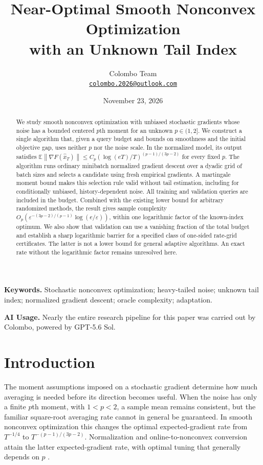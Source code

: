 \documentclass[11pt,a4paper]{article}
\title{Near-Optimal Smooth Nonconvex Optimization\\
with an Unknown Tail Index}
\author{Colombo Team\\[0.25em]
\small\href{mailto:colombo.2026@outlook.com}{\texttt{colombo.2026@outlook.com}}}
\date{November 23, 2026}
\newcommand{\E}{\mathbb{E}}
\newcommand{\eps}{\varepsilon}
\newcommand{\norm}[1]{\left\lVert #1\right\rVert}
\theoremstyle{definition}
\theoremstyle{remark}
\begin{document}
\maketitle

\begin{abstract}
We study smooth nonconvex optimization with unbiased stochastic gradients whose
noise has a bounded centered $p$th moment for an unknown $p\in(1,2]$.
We construct a single algorithm that, given a query budget and bounds on
smoothness and the initial objective gap, uses neither $p$ nor the noise scale.
In the normalized model, its output satisfies
$\E\norm{\nabla F(\widehat x_T)}
\le C_p(\log(eT)/T)^{(p-1)/(3p-2)}$ for every fixed $p$.
The algorithm runs ordinary minibatch normalized gradient descent over a
dyadic grid of batch sizes and selects a candidate using fresh empirical
gradients. A martingale moment bound makes this selection rule valid without
tail estimation, including for conditionally unbiased, history-dependent noise.
All training and validation queries are included in the budget.
Combined with the existing lower bound for arbitrary randomized methods,
the result gives sample complexity
$O_p(\eps^{-(3p-2)/(p-1)}\log(e/\eps))$, within one logarithmic
factor of the known-index optimum. We also show that validation can use
a vanishing fraction of the total budget and establish a sharp logarithmic
barrier for a specified class of one-sided rate-grid certificates.
The latter is not a lower bound for general adaptive algorithms.
An exact rate without the logarithmic factor remains unresolved here.
\end{abstract}

\noindent\textbf{Keywords.} Stochastic nonconvex optimization; heavy-tailed noise;
unknown tail index; normalized gradient descent; oracle complexity; adaptation.

\begin{samepage}
\noindent\textbf{AI Usage.}
Nearly the entire research pipeline for this paper was carried out by
Colombo, powered by GPT-5.6 Sol.
\par
\end{samepage}

\section{Introduction}\label{sec:introduction}

The moment assumptions imposed on a stochastic gradient determine how much
averaging is needed before its direction becomes useful. When the noise has
only a finite $p$th moment, with $1<p<2$, a sample mean remains consistent,
but the familiar square-root averaging rate cannot in general be guaranteed. In smooth
nonconvex optimization this changes the optimal expected-gradient rate from
$T^{-1/4}$ to $T^{-(p-1)/(3p-2)}$. Normalization and
online-to-nonconvex conversion attain the latter expected-gradient rate,
with optimal tuning that generally depends on $p$
\cite{hubler2025normalization,liuzhou2025,liu2026oco}.
\end{document}

